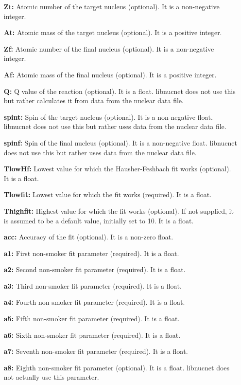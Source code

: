 \documentclass{article}    %
\begin{document}
\begin{itemize}

\item[{\bf Zt:}]  Atomic number of the target nucleus (optional).
It is a non-negative integer.
\item[{\bf At:}]  Atomic mass of the target nucleus (optional).  It
is a positive integer.
\item[{\bf Zf:}]  Atomic number of the final nucleus (optional).  It
is a non-negative integer.
\item[{\bf Af:}]  Atomic mass of the final nucleus (optional).  It
is a positive integer.
\item[{\bf Q:}]  Q value of the reaction (optional).  It is a float.
libnucnet does not use this but rather calculates it from data from
the nuclear data file.
\item[{\bf spint:}]  Spin of the target nucleus (optional).  It is a non-negative float.
libnucnet does not use this but rather uses data from the nuclear
data file.
\item[{\bf spinf:}] Spin of the final nucleus (optional).  It is a non-negative float.
libnucnet does not use this but rather uses data from the nuclear
data file.
\item[{\bf TlowHf:}]  Lowest value for which the Hausher-Feshbach
fit works (optional).  It is a float.
\item[{\bf Tlowfit:}]  Lowest value for which the
fit works (required).  It is a float.
\item[{\bf Thighfit:}]  Highest value for which the
fit works (optional).  If not supplied, it is assumed to be a default value,
initially set to 10.  It is a float.
\item[{\bf acc:}]  Accuracy of the fit (optional).  It is a non-zero
float.
\item[{\bf a1:}]  First non-smoker fit parameter (required).  It is a
float.
\item[{\bf a2:}]  Second non-smoker fit parameter (required).  It is
a float.
\item[{\bf a3:}]  Third non-smoker fit parameter (required).  It is
a float.
\item[{\bf a4:}]  Fourth non-smoker fit parameter (required).  It is
a float.
\item[{\bf a5:}]  Fifth non-smoker fit parameter (required).  It is
a float.
\item[{\bf a6:}]  Sixth non-smoker fit parameter (required).  It is
a float.
\item[{\bf a7:}]  Seventh non-smoker fit parameter (required).  It
is a float.
\item[{\bf a8:}]  Eighth non-smoker fit parameter (optional).  It is
a float.  libnucnet does not actually use this parameter.

\end{itemize}
\end{document}

